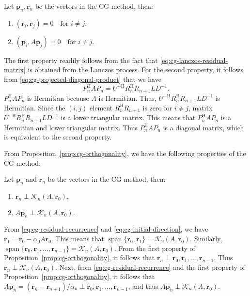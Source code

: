 \begin{Proposition}\label{prop:cg-orthogonality}
{Let $\bm p_n,\bm r_n$ be the vectors in the CG method, then:}
\begin{enumerate}\item $(\bm r_i,\bm r_j)=0\quad\text{for }i\ne j$,\item $(\bm p_i,A\bm p_j)=0\quad\text{for }i\ne j$.\end{enumerate}
\end{Proposition}
\begin{Proof}
{The first property readily follows from the fact that \eqref{eq:cg-lanczos-residual-matrix} is obtained from the Lanczos process. For the second property, it follows from \eqref{eq:cg-projected-diagonal-product} that we have}
\[P_n^{\mathrm H}AP_n=U^{-\mathrm H}R_n^{\mathrm H}R_{n+1}LD^{-1}.\]
{$P_n^{\mathrm H}AP_n$ is Hermitian because $A$ is Hermitian. Thus, $U^{-\mathrm H}R_n^{\mathrm H}R_{n+1}LD^{-1}$ is Hermitian. Since the $(i,j)$ element $R_n^{\mathrm H}R_{n+1}$ is zero for $i\ne j$, matrix $U^{-\mathrm H}R_n^{\mathrm H}R_{n+1}LD^{-1}$ is a lower triangular matrix. This means that $P_n^{\mathrm H}AP_n$ is a Hermitian and lower triangular matrix. Thus $P_n^{\mathrm H}AP_n$ is a diagonal matrix, which is equivalent to the second property.}
\end{Proof}
{From Proposition\ \ref{prop:cg-orthogonality}, we have the following properties of the CG method:}
\begin{Corollary}\label{cor:cg-krylov-orthogonality}
{Let $\bm p_n$ and $\bm r_n$ be the vectors in the CG method, then:}
\begin{enumerate}\item $\bm r_n\perp\mathcal K_n(A,\bm r_0)$,\item $A\bm p_n\perp\mathcal K_n(A,\bm r_0)$.\end{enumerate}
\end{Corollary}
\begin{Proof}
{From \eqref{eq:cg-residual-recurrence} and \eqref{eq:cg-initial-direction}, we have $\bm r_1=\bm r_0-\alpha_0A\bm r_0$. This means that $\operatorname{span}\{\bm r_0,\bm r_1\}=\mathcal K_2(A,\bm r_0)$. Similarly, $\operatorname{span}\{\bm r_0,\bm r_1,\ldots,\bm r_{n-1}\}=\mathcal K_n(A,\bm r_0)$. From the first property of Proposition\ \ref{prop:cg-orthogonality}, it follows that $\bm r_n\perp\bm r_0,\bm r_1,\ldots,\bm r_{n-1}$. Thus $\bm r_n\perp\mathcal K_n(A,\bm r_0)$. Next, from \eqref{eq:cg-residual-recurrence} and the first property of Proposition\ \ref{prop:cg-orthogonality}, it follows that $A\bm p_n=(\bm r_n-\bm r_{n+1})/\alpha_n\perp\bm r_0,\bm r_1,\ldots,\bm r_{n-1}$, and thus $A\bm p_n\perp\mathcal K_n(A,\bm r_0)$.}
\end{Proof}
